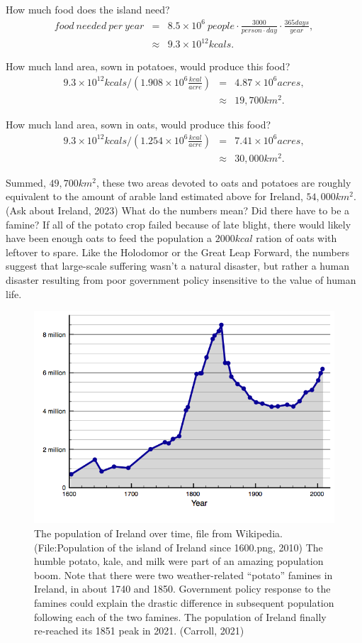 \documentclass[man]{apa7}
\newcommand{\bea}{\begin{eqnarray}}
\newcommand{\eea}{\end{eqnarray}}
\begin{document}
How much food does the island need?
\bea
food~needed~per~year &=& 8.5\times10^6~people
	\cdot \frac{3000}{person\cdot day }
	\cdot \frac{365days}{year} , \nonumber \\
&\approx& 9.3\times 10^{12} kcals . 
\eea       

How much land area, sown in potatoes, would produce this food?
\bea
9.3\times10^{12}kcals /\left(1.908\times 10^6\frac{kcal}{acre}\right) &=& 4.87\times10^6 acres , \nonumber\\
 &\approx& 19,700 km^2 . 
\eea

How much land area, sown in oats, would produce this food?
\bea
9.3\times10^{12}kcals /\left(1.254\times10^6\frac{kcal}{acre}\right) &=& 7.41 \times10^6 acres , \nonumber \\
 &\approx& 30,000 km^2 . 
\eea

Summed, $49,700km^2$, these two areas devoted to oats and potatoes are roughly equivalent to the amount of arable land estimated above for Ireland, $54,000km^2$. (Ask about Ireland, 2023)  
What do the numbers mean?  Did there have to be a famine?  If all of the potato crop failed because of late blight, there would likely have been enough oats to feed the population a $2000kcal$ ration of oats with leftover to spare.  
Like the Holodomor or the Great Leap Forward, the numbers suggest that large-scale suffering wasn't  a natural disaster, but rather a human disaster resulting from poor government policy insensitive to the value of human life.    



\begin{figure}[ht!]
\centering
\includegraphics[width=\columnwidth]{Population_of_Ireland_since_1600.png}
\caption{
The population of Ireland over time, file from Wikipedia. (File:Population of the island of Ireland since 1600.png, 2010)
The humble potato, kale, and milk were part of an amazing population boom.  Note that there were two weather-related ``potato'' famines in Ireland, in about 1740 and 1850.  Government policy response to the famines could explain the drastic difference in subsequent population following each of the two famines.  The population of Ireland finally re-reached its 1851 peak in 2021. (Carroll, 2021)  
}
\label{ireland_population}
\end{figure}
\end{document}
